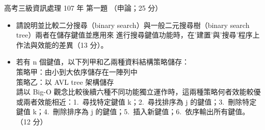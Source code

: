 \begin{pastexam}[label={px:gk3-107-ds-01}]{高考三級資訊處理 107 年 第一題}
（申論；25 分）

\begin{itemize}[leftmargin=2.2em]
\item[㈠] 請說明並比較二分搜尋（binary search）與一般二元搜尋樹（binary search tree）兩者在儲存鍵值並應用來
進行搜尋鍵值功能時，在'建置'與'搜尋'程序上作法與效能的差異（13 分）。
\item[㈡] 若有 n 個鍵值，以下列甲和乙兩種資料結構策略儲存：\\
策略甲：由小到大依序儲存在一陣列中\\
策略乙：以 AVL tree 架構儲存\\
請以 Big-O 觀念比較後續六種不同功能獨立運作時，這兩種策略何者效能較優或兩者效能相近：1.~尋找特定鍵值
k；2.~尋找排序為 j 的鍵值；3.~刪除特定鍵值 k；4.~刪除排序為 j 的鍵值；5.~插入新鍵值；6.~依序輸出所有鍵值。
（12 分）
\end{itemize}
\end{pastexam}

